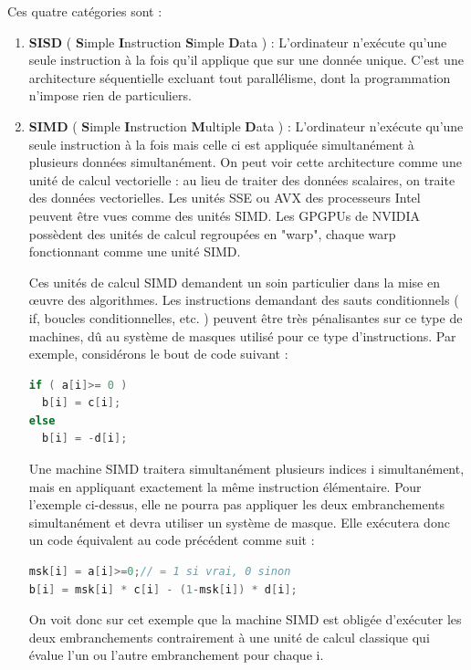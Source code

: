 \documentclass[fleqn,11pt]{article}
\begin{document}
Ces quatre catégories sont : 
\begin{enumerate}
\item \textbf{SISD} ( {\bf S}imple {\bf I}nstruction {\bf S}imple {\bf D}ata ) : L'ordinateur n'exécute qu'une seule instruction à la fois qu'il applique que sur une donnée unique. C'est une architecture séquentielle excluant tout parallélisme, dont la programmation n'impose rien de particuliers.

\item \textbf{SIMD} ( {\bf S}imple {\bf I}nstruction {\bf M}ultiple {\bf D}ata ) : L'ordinateur n'exécute qu'une seule instruction à la fois mais celle ci est appliquée simultanément à plusieurs données simultanément. On peut voir cette architecture comme une unité de calcul vectorielle : au lieu de traiter des données scalaires, on traite des données vectorielles. Les unités SSE ou AVX des processeurs Intel peuvent être vues comme des unités SIMD. Les GPGPUs de NVIDIA possèdent des unités de calcul regroupées en "warp",  chaque warp fonctionnant comme une unité SIMD. 

Ces unités de calcul SIMD demandent un soin particulier dans la mise en œuvre des algorithmes. Les instructions demandant des sauts conditionnels ( if, boucles conditionnelles, etc. ) peuvent être très pénalisantes sur ce type de machines, dû au système de masques utilisé pour ce type d'instructions. Par exemple, considérons le bout de code suivant :

\begin{lstlisting}[language=C++]
if ( a[i]>= 0 )
  b[i] = c[i];
else
  b[i] = -d[i];
\end{lstlisting}

Une machine SIMD traitera simultanément plusieurs indices i simultanément, mais en appliquant exactement  la même instruction élémentaire.  Pour l'exemple ci-dessus, elle ne pourra pas appliquer les deux embranchements simultanément et devra utiliser un système de masque. Elle exécutera donc un code équivalent au code précédent  comme suit :

\begin{lstlisting}[language=C++]
msk[i] = a[i]>=0;// = 1 si vrai, 0 sinon
b[i] = msk[i] * c[i] - (1-msk[i]) * d[i];
\end{lstlisting}

On voit donc sur cet exemple que la machine SIMD est obligée  d'exécuter les deux embranchements contrairement à une unité de calcul classique qui évalue l'un ou l'autre embranchement pour chaque i.


\end{enumerate}
\end{document}
